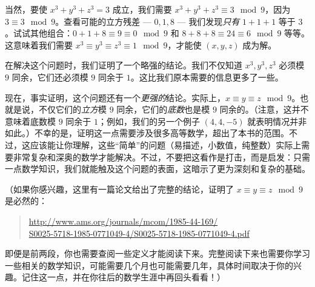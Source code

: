 \begin{example}
    当然，要使 $x^3 + y^3 + z^3 = 3$ 成立，我们需要 $x^3 + y^3 + z^3 \equiv 3 \mod 9$，因为 $3 \equiv 3 \mod 9$。查看可能的立方残差 --- $0, 1, 8$ --- 我们发现\emph{只有} $1 + 1 + 1$ 等于 $3$。试试其他组合：$0 + 1 + 8 \equiv 9 \equiv 0 \mod 9$ 和 $8 + 8 + 8 \equiv 24 \equiv 6 \mod 9$ 等等。这意味着我们需要 $x^3 \equiv y^3 \equiv z^3 \equiv 1 \mod 9$，才能使 $(x, y, z)$ 成为解。

    在解决这个问题时，我们证明了一个略强的结论。我们不仅知道 $x^3,y^3,z^3$ 必须模 $9$ 同余，它们还必须模 $9$ 同余于 $1$。这比我们原本需要的信息更多了一些。

    现在，事实证明，这个问题还有一个\emph{更强的}结论。实际上，$x \equiv y \equiv z \mod 9$。也就是说，不仅它们的\emph{立方}模 $9$ 同余，它们的\emph{底数}也是模 $9$ 同余的。（注意，这并不意味着底数模 $9$ 同余于 $1$；例如，我们的另一个例子 $(4, 4, -5)$ 就表明情况并非如此。）不幸的是，证明这一点需要涉及很多高等数学，超出了本书的范围。不过，这应该能让你理解，这些``简单''的问题（易描述，小数值，纯整数）实际上需要非常复杂和深奥的数学才能解决。不过，不要把这看作是打击，而是启发：只需一点数学知识，我们就能触及这个问题的表面，这暗示了更为深刻和复杂的基础。

    （如果你感兴趣，这里有一篇论文给出了完整的结论，证明了 $x \equiv y \equiv z \mod 9$ 是必然的：
    \begin{quote}
        \href{http://www.ams.org/journals/mcom/1985-44-169/S0025-5718-1985-0771049-4/S0025-5718-1985-0771049-4.pdf}{http://www.ams.org/journals/mcom/1985-44-169/\\S0025-5718-1985-0771049-4/S0025-5718-1985-0771049-4.pdf}
    \end{quote}
    即便是前两段，你也需要查阅一些定义才能阅读下来。完整阅读下来也需要你学习一些相关的数学知识，可能需要几个月也可能需要几年，具体时间取决于你的兴趣。记住这一点，并在你往后的数学生涯中再回头看看！）
\end{example}
